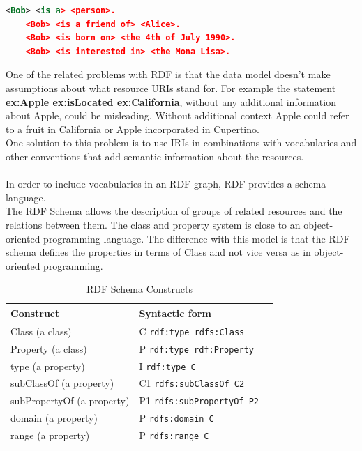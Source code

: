 \begin{lstlisting}[language=XML, caption={RDF Grouped Data}, label={lst:xml-rdf-grouped-example}, frame=single]
	<Bob> <is a> <person>.
	<Bob> <is a friend of> <Alice>.
	<Bob> <is born on> <the 4th of July 1990>.
	<Bob> <is interested in> <the Mona Lisa>.
\end{lstlisting}
One of the related problems with RDF is that the data model doesn't make assumptions about what resource URIs stand for.
For example the statement \space \textbf{ex:Apple ex:isLocated ex:California}, without any additional information about Apple, could be misleading. Without additional context Apple could refer to a fruit in California or Apple incorporated in Cupertino.
\\
One solution to this problem is to use IRIs in combinations with vocabularies and other conventions that add semantic information about the resources.
\\
\\
In order to include vocabularies in an RDF graph, RDF provides a schema language.
\\
The RDF Schema allows the description of groups of related resources and the relations between them.
The class and property system is close to an object-oriented programming language. The difference with this model is that the RDF schema defines the properties in terms of Class and not vice versa as in object-oriented programming.
\begin{table}[h]
    \centering
    \begin{tabular}{lll}
        \toprule
        \textbf{Construct} & \textbf{Syntactic form} \\
        \midrule
        Class (a class) & C \texttt{rdf:type rdfs:Class}  \\
        Property (a class) & P \texttt{rdf:type rdf:Property} \\
        type (a property) & I \texttt{rdf:type C} \\
        subClassOf (a property) & C1 \texttt{rdfs:subClassOf C2} \\
        subPropertyOf (a property) & P1 \texttt{rdfs:subPropertyOf P2} \\
        domain (a property) & P \texttt{rdfs:domain C} \\
        range (a property) & P \texttt{rdfs:range C} \\
        \bottomrule
    \end{tabular}
    \caption{RDF Schema Constructs}
    \label{tab:rdf_schema_constructs}
\end{table}

